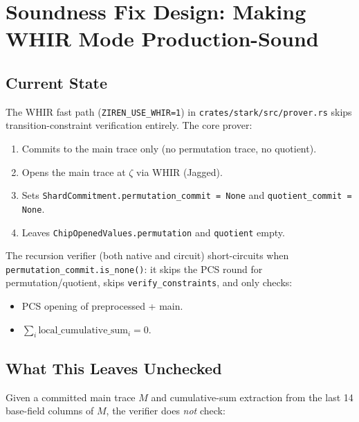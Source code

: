 \section{Soundness Fix Design: Making WHIR Mode Production-Sound}
\label{sec:soundness-fix}

\subsection{Current State}

The WHIR fast path (\texttt{ZIREN\_USE\_WHIR=1}) in
\texttt{crates/stark/src/prover.rs} skips transition-constraint verification
entirely. The core prover:
\begin{enumerate}
  \item Commits to the main trace only (no permutation trace, no quotient).
  \item Opens the main trace at $\zeta$ via WHIR (Jagged).
  \item Sets \texttt{ShardCommitment.permutation\_commit = None} and
        \texttt{quotient\_commit = None}.
  \item Leaves \texttt{ChipOpenedValues.permutation} and \texttt{quotient}
        empty.
\end{enumerate}

The recursion verifier (both native and circuit) short-circuits when
\texttt{permutation\_commit.is\_none()}: it skips the PCS round for
permutation/quotient, skips \texttt{verify\_constraints}, and only checks:
\begin{itemize}
  \item PCS opening of preprocessed + main.
  \item $\sum_i \text{local\_cumulative\_sum}_i = 0$.
\end{itemize}

\subsection{What This Leaves Unchecked}

Given a committed main trace $M$ and cumulative-sum extraction from the last
14 base-field columns of $M$, the verifier does \emph{not} check:

